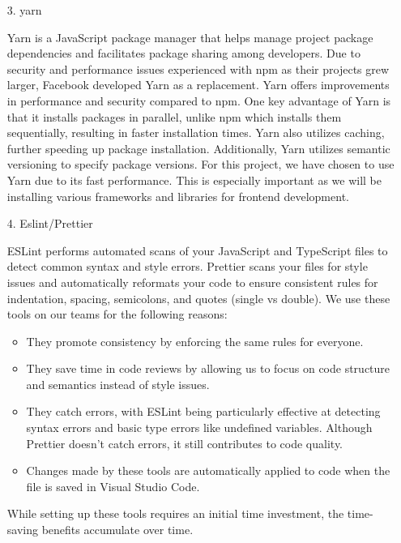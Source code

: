 \documentclass[conference, a4paper]{IEEEtran}
\begin{document}
\begin{enumerate}
\begin{enumerate}
        \item[3.]yarn \cite{yarn2016}
        \item[]Yarn is a JavaScript package manager that helps manage project package dependencies and facilitates package sharing among developers. Due to security and performance issues experienced with npm as their projects grew larger, Facebook developed Yarn as a replacement. Yarn offers improvements in performance and security compared to npm. One key advantage of Yarn is that it installs packages in parallel, unlike npm which installs them sequentially, resulting in faster installation times. Yarn also utilizes caching, further speeding up package installation. Additionally, Yarn utilizes semantic versioning to specify package versions. For this project, we have chosen to use Yarn due to its fast performance. This is especially important as we will be installing various frameworks and libraries for frontend development. \\

        \item[4.]Eslint/Prettier \cite{eslintprettier}
        \item[]ESLint performs automated scans of your JavaScript and TypeScript files to detect common syntax and style errors. Prettier scans your files for style issues and automatically reformats your code to ensure consistent rules for indentation, spacing, semicolons, and quotes (single vs double). We use these tools on our teams for the following reasons: \\
        \begin{itemize}
            \item They promote consistency by enforcing the same rules for everyone.
            \item They save time in code reviews by allowing us to focus on code structure and semantics instead of style issues.
            \item They catch errors, with ESLint being particularly effective at detecting syntax errors and basic type errors like undefined variables. Although Prettier doesn't catch errors, it still contributes to code quality.
            \item Changes made by these tools are automatically applied to code when the file is saved in Visual Studio Code.
        \end{itemize}
        While setting up these tools requires an initial time investment, the time-saving benefits accumulate over time.\\


\end{enumerate}
\end{enumerate}
\end{document}
